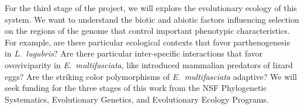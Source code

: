 For the third stage of the project, we will explore the evolutionary ecology of
this system.
We want to understand the biotic and abiotic factors influencing selection on
the regions of the genome that control important phenotypic characteristics.
For example, are there particular ecological contexts that favor
parthenogenesis in \emph{L.\ lugubris}?
Are there particular inter-specific interactions that favor ovoviviparity in
\emph{E.\ multifasciata}, like introduced mammalian predators of lizard eggs?
Are the striking color polymorphisms of \emph{E.\ multifasciata} adaptive?
We will seek funding for the three stages of this work from the NSF
Phylogenetic Systematics, Evolutionary Genetics, and Evolutionary Ecology
Programs.

